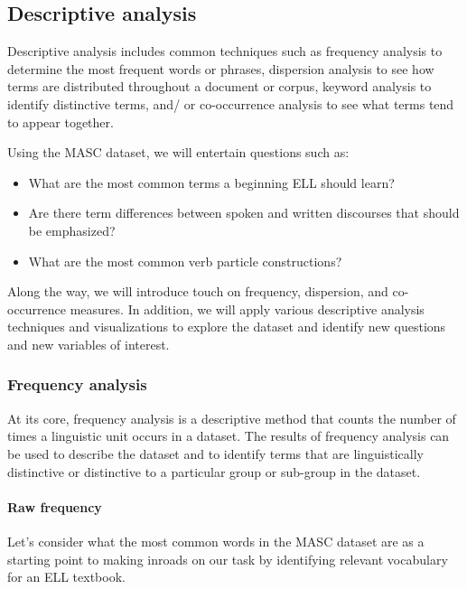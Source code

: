 \documentclass[
  letterpaper,
]{latex/krantz}
\let\oldparagraph\paragraph
\renewcommand{\paragraph}[1]{\oldparagraph{#1}\mbox{}}
\providecommand{\tightlist}{%
  \setlength{\itemsep}{0pt}\setlength{\parskip}{0pt}}\usepackage{longtable,booktabs,array}
\theoremstyle{definition}
\theoremstyle{remark}
\begin{document}
\subsection{Descriptive analysis}\label{sec-eda-descriptive}

Descriptive analysis includes common techniques such as frequency
analysis to determine the most frequent words or phrases, dispersion
analysis to see how terms are distributed throughout a document or
corpus, keyword analysis to identify distinctive terms, and/ or
co-occurrence analysis to see what terms tend to appear together.

Using the MASC dataset, we will entertain questions such as:

\begin{itemize}
\tightlist
\item
  What are the most common terms a beginning ELL should learn?
\item
  Are there term differences between spoken and written discourses that
  should be emphasized?
\item
  What are the most common verb particle constructions?
\end{itemize}

Along the way, we will introduce touch on frequency, dispersion, and
co-occurrence measures. In addition, we will apply various descriptive
analysis techniques and visualizations to explore the dataset and
identify new questions and new variables of interest.

\subsubsection{Frequency analysis}\label{sec-eda-frequency}

At its core, frequency analysis is a descriptive method that counts the
number of times a linguistic unit occurs in a dataset. The results of
frequency analysis can be used to describe the dataset and to identify
terms that are linguistically distinctive or distinctive to a particular
group or sub-group in the dataset.

\paragraph{Raw frequency}\label{sec-eda-frequency-raw}

Let's consider what the most common words in the MASC dataset are as a
starting point to making inroads on our task by identifying relevant
vocabulary for an ELL textbook.
\end{document}

